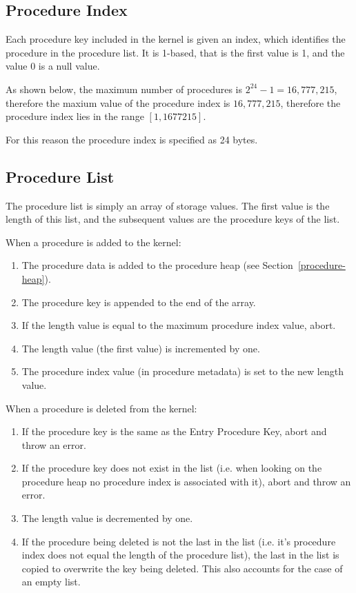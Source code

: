 \documentclass[english,a4paper]{article}
\begin{document}
\subsection{Procedure Index}
Each procedure key included in the kernel is given an index, which identifies
the procedure in the procedure list. It is 1-based, that is the first value is 1,
and the value 0 is a null value.

As shown below, the maximum number of procedures is $2^{24} - 1 = 16,777,215$,
therefore the maxium value of the procedure index is $16,777,215$, therefore the procedure
index lies in the range $\left[1,1677215\right]$.

For this reason the procedure index is specified as 24 bytes.

\subsection{Procedure List}\label{procedure-table}
The procedure list is simply an array of storage values. The first value is the
length of this list, and the subsequent values are the procedure keys of the
list.

When a procedure is added to the kernel:

\begin{enumerate}
  \item The procedure data is added to the procedure heap (see
  Section~\ref{procedure-heap}).
  \item The procedure key is appended to the end of the array.
  \item If the length value is equal to the maximum procedure index value,
  abort.
  \item The length value (the first value) is incremented by one.
  \item The procedure index value (in procedure metadata) is set to the new
  length value.
\end{enumerate}

When a procedure is deleted from the kernel:

\begin{enumerate}
  \item If the procedure key is the same as the Entry Procedure Key, abort and
  throw an error.
  \item If the procedure key does not exist in the list (i.e. when looking on
  the procedure heap no procedure index is associated with it), abort and throw
  an error.
  \item The length value is decremented by one.
  \item If the procedure being deleted is not the last in the list (i.e. it's
  procedure index does not equal the length of the procedure list), the last in
  the list is copied to overwrite the key being deleted. This also accounts for
  the case of an empty list.
\end{enumerate}
\end{document}
